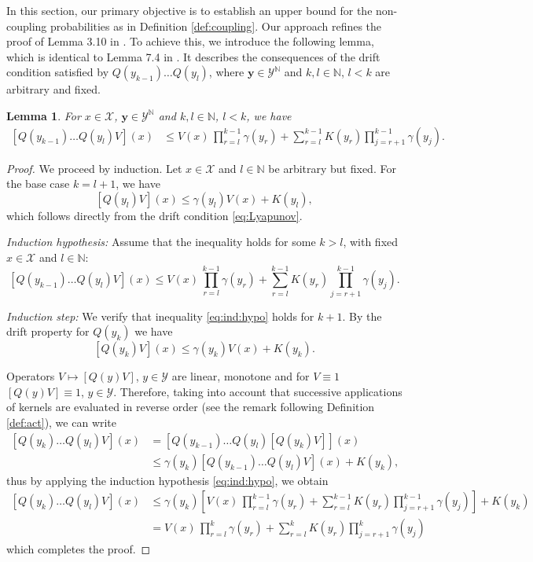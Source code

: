 \documentclass[a4paper,10pt]{article}
\newtheorem{lemma}[theorem]{Lemma}
\newcommand{\N}{\mathbb{N}}
\newcommand{\X}{\mathcal{X}}
\newcommand{\Y}{\mathcal{Y}}
\newcommand{\ga}{\gamma}
\begin{document}
In this section, our primary objective is to establish an upper bound for the non-coupling probabilities as in Definition \ref{def:coupling}. Our approach refines the proof of Lemma 3.10 in \cite{lovasCLT}. To achieve this, we introduce the following lemma, which is identical to Lemma 7.4 in \cite{lovas}. It describes the consequences of the drift condition satisfied by $Q(y_{k-1})\ldots Q(y_l)$, where $\mathbf{y}\in\Y^\N$ and $k,l\in\N$, $l<k$ are arbitrary and fixed.
\begin{lemma}\label{lem:ita} %
	For $x\in\X$, $\mathbf{y}\in\Y^\N$ and $k,l\in\N$, $l<k$, we have	
	\begin{align*}
	\left[Q(y_{k-1})\ldots Q(y_{l}) V\right](x) &\le 
	V(x)\,\prod_{r=l}^{k-1}
	\ga (y_r)
	+ \sum_{r=l}^{k-1}K(y_r)\prod_{j=r+1}^{k-1}
	\ga (y_j).
	\end{align*}
\end{lemma}
\begin{proof}	
	We proceed by induction. Let $x \in \X$ and $l \in \N$ be arbitrary but fixed. For the base case $k = l+1$, we have
	\begin{equation}
		\left[Q(y_{l})V\right](x) \le \ga (y_l)V(x) + K(y_l),
	\end{equation}
	which follows directly from the drift condition \eqref{eq:Lyapunov}.
	
	\medskip\noindent
	\emph{Induction hypothesis:} Assume that the inequality holds for some $k > l$, with fixed $x \in \X$ and $l \in \N$:
	\begin{equation}\label{eq:ind:hypo}
		\left[Q(y_{k-1})\ldots Q(y_{l}) V\right](x) \le 
		V(x)\,\prod_{r=l}^{k-1}
		\ga (y_r)
		+ \sum_{r=l}^{k-1}K(y_r)\prod_{j=r+1}^{k-1}
		\ga (y_j).
	\end{equation}
	
	\medskip\noindent
	\emph{Induction step:} We verify that inequality \eqref{eq:ind:hypo} holds for $k+1$. By the drift property for $Q(y_k)$ we have
	$$
	[Q(y_k)V](x)\le \ga (y_k)V(x)+K(y_k).
	$$
	
	Operators $V\mapsto [Q(y)V]$, $y\in\Y$ are linear, monotone and for $V\equiv 1$ $[Q(y)V]\equiv 1$, $y\in\Y$. Therefore, taking into account that successive applications of kernels are evaluated in reverse order (see the remark following Definition \ref{def:act}), we can write
	\begin{align*}
		\left[Q(y_{k})\ldots Q(y_{l}) V\right](x) &=
			\left[Q(y_{k-1})\ldots Q(y_{l}) [Q(y_{k}) V]\right](x)
			\\
			&\le \ga (y_k) \left[Q(y_{k-1})\ldots Q(y_{l}) V\right](x)+K(y_k),
	\end{align*}
	thus by applying the induction hypothesis \eqref{eq:ind:hypo}, we obtain
	\begin{align*}
		\left[Q(y_{k})\ldots Q(y_{l}) V\right](x) 
		&\le
		\ga (y_k)\left[
		V(x)\,\prod_{r=l}^{k-1}
		\ga (y_r)
		+ \sum_{r=l}^{k-1}K(y_r)\prod_{j=r+1}^{k-1}
		\ga (y_j)
		\right]+K(y_k)
		\\
		&=
		V(x)\,\prod_{r=l}^{k}
		\ga (y_r)
		+ \sum_{r=l}^{k}K(y_r)\prod_{j=r+1}^{k}
		\ga (y_j)
	\end{align*}
	which completes the proof.
\end{proof}
\end{document}
